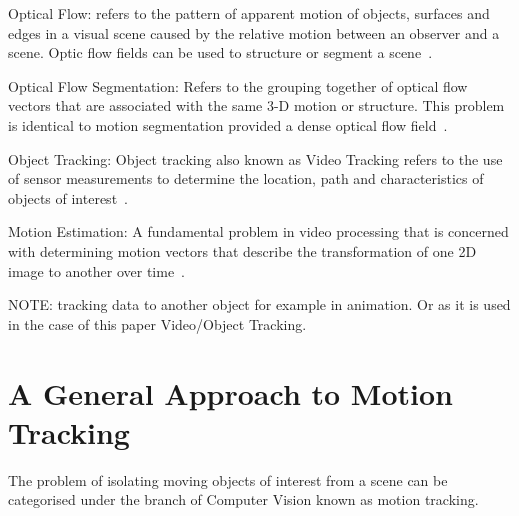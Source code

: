 Optical Flow: refers to the pattern of apparent motion of objects, surfaces and
edges in a visual scene caused by the relative motion between an observer and a
scene. Optic flow fields can be used to structure or segment a scene~\cite{Forsyth2012}.

Optical Flow Segmentation: Refers to the grouping together of optical flow
vectors that are associated with the same 3-D motion or structure. This problem
is identical to motion segmentation provided a dense optical flow field~\cite{Tekalp2014}.

Object Tracking: Object tracking also known as Video Tracking refers to the use
of sensor measurements to determine the location, path and characteristics of
objects of interest~\cite{Challa2011}.
 
Motion Estimation: A fundamental problem in video processing that is concerned
with determining motion vectors that describe the transformation of one 2D
image to another over time~\cite{Tekalp2014}.

NOTE:\@
tracking data to another object for example in animation. Or as it is used in the
case of this paper Video/Object Tracking.

\section{A General Approach to Motion Tracking}\label{literature_review_general_approach}
The problem of isolating moving objects of interest from a scene can
be categorised under the branch of Computer Vision known as motion
tracking.

